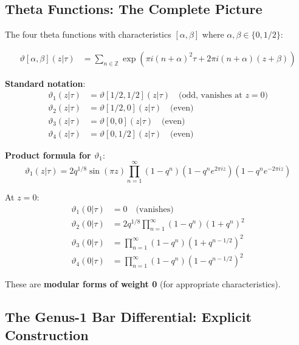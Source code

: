 \subsection{Theta Functions: The Complete Picture}

\begin{definition}
\label{def:jacobi-theta}
The four theta functions with characteristics $[\alpha, \beta]$ where $\alpha, \beta \in \{0, 1/2\}$:

\begin{align}
\vartheta[\alpha, \beta](z|\tau) &= \sum_{n \in \mathbb{Z}} \exp\left(\pi i (n+\alpha)^2 \tau + 2\pi i (n+\alpha)(z+\beta)\right)
\end{align}

\textbf{Standard notation}:
\begin{align}
\vartheta_1(z|\tau) &= \vartheta[1/2, 1/2](z|\tau) \quad \text{(odd, vanishes at } z=0\text{)} \\
\vartheta_2(z|\tau) &= \vartheta[1/2, 0](z|\tau) \quad \text{(even)} \\
\vartheta_3(z|\tau) &= \vartheta[0, 0](z|\tau) \quad \text{(even)} \\
\vartheta_4(z|\tau) &= \vartheta[0, 1/2](z|\tau) \quad \text{(even)}
\end{align}

\textbf{Product formula for $\vartheta_1$}:
\begin{equation}
\vartheta_1(z|\tau) = 2q^{1/8}\sin(\pi z) \prod_{n=1}^{\infty} (1-q^n)(1-q^n e^{2\pi i z})(1-q^n e^{-2\pi i z})
\end{equation}
\end{definition}

\begin{theorem}
\label{thm:theta-zero}
At $z = 0$:
\begin{align}
\vartheta_1(0|\tau) &= 0 \quad \text{(vanishes)} \\
\vartheta_2(0|\tau) &= 2q^{1/8} \prod_{n=1}^{\infty} (1-q^n)(1+q^n)^2 \\
\vartheta_3(0|\tau) &= \prod_{n=1}^{\infty} (1-q^n)(1+q^{n-1/2})^2 \\
\vartheta_4(0|\tau) &= \prod_{n=1}^{\infty} (1-q^n)(1-q^{n-1/2})^2
\end{align}

These are \textbf{modular forms of weight 0} (for appropriate characteristics).
\end{theorem}

\subsection{The Genus-1 Bar Differential: Explicit Construction}

